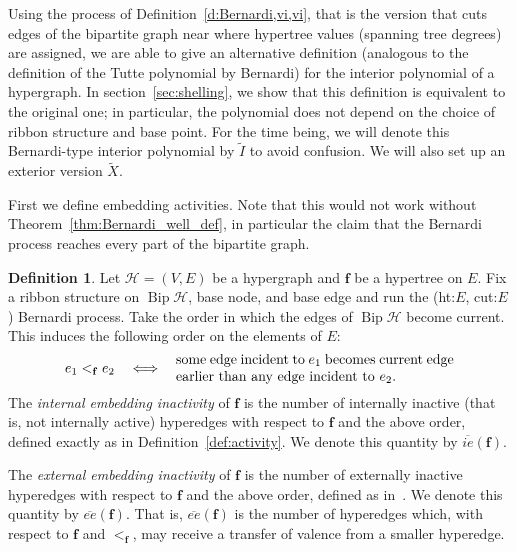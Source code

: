 \documentclass[10pt]{amsart}
\theoremstyle{definition}\newtheorem{defi}[theo]{Definition}
\theoremstyle{remark}\newtheorem{rema}[theo]{Remark}
\newcommand{\HH}{\mathcal H}
\DeclareMathOperator{\bip}{Bip}
\begin{document}
Using the process of Definition~\ref{d:Bernardi,vi,vi}, that is the version that cuts edges of the bipartite graph near where hypertree values (spanning tree degrees) are assigned, we are able to give an alternative definition (analogous to the definition of the Tutte polynomial by Bernardi) for the interior polynomial of a hypergraph. 
In section~\ref{sec:shelling}, we show that this definition is equivalent to the original one; in particular, the polynomial does not depend on the choice of ribbon structure and base point. For the time being, we will denote this Bernardi-type interior polynomial by $\tilde{I}$ to avoid confusion. We will also set up an exterior version $\tilde X$. 

First we define embedding activities. Note that this would not work without Theorem~\ref{thm:Bernardi_well_def}, in particular the claim that the Bernardi process reaches every part of the bipartite graph.

\begin{defi}
\label{def:hyperactivity}
Let $\HH=(V,E)$ be a hypergraph and $\mathbf f$ be a hypertree on $E$. Fix a ribbon structure on $\bip\HH$, base node, and base edge and run the (ht:$E$, cut:$E$) Bernardi process. Take the order in which the edges of $\bip \HH$ become current. This induces the following order on the elements of $E$:
\begin{equation}
\label{eq:hyperedge_order}
 e_1<_{\mathbf f}e_2 \quad \Longleftrightarrow \quad \text{\parbox{7cm}{some edge incident to $e_1$ becomes current edge earlier than any edge incident to $e_2$.}}
\end{equation}
The \emph{internal embedding inactivity} of $\mathbf f$ is the number of internally inactive (that is, not internally active) hyperedges with respect to $\mathbf f$ and the above order, defined exactly as in Definition~\ref{def:activity}. We denote this quantity by $\overline{ie}(\mathbf f)$.

The \emph{external embedding inactivity} of $\mathbf f$ is the number of externally inactive hyperedges with respect to $\mathbf f$ and the above order, defined as in~\cite[Definition~5.1]{hiperTutte}. We denote this quantity by $\overline{ee}(\mathbf f)$. That is, $\overline{ee}(\mathbf f)$ is the number of hyperedges which, with respect to $\mathbf f$ and $<_\mathbf f$, may receive a transfer of valence from a smaller hyperedge. 
\end{defi}
\end{document}
